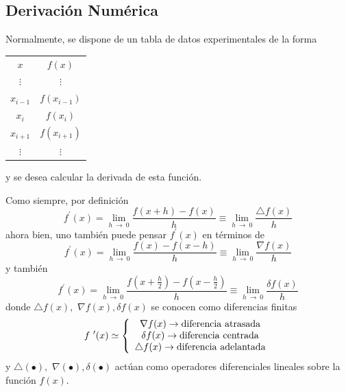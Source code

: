 \documentclass[spanish,titlepage,11pt]{article}
\begin{document}
\subsection{Derivaci\'{o}n Num\'{e}rica}

Normalmente, se dispone de un tabla de datos experimentales de la forma

\begin{center}%
\begin{tabular}
[c]{cc}%
$x$ & $f(x)$\\
$\vdots$ & $\vdots$\\
$x_{i-1}$ & $f(x_{i-1})$\\
$x_{i}$ & $f(x_{i})$\\
$x_{i+1}$ & $f(x_{i+1})$\\
$\vdots$ & $\vdots$%
\end{tabular}
\end{center}

y se desea calcular la derivada de esta funci\'{o}n.

Como siempre, por definici\'{o}n
\[
f^{\prime}(x)=\lim_{h\ \rightarrow\ 0}\frac{f(x+h)-f(x)}{h}\equiv
\lim_{h\ \rightarrow\ 0}\frac{\triangle f(x)}{h}%
\]
ahora bien, uno tambi\'{e}n puede pensar $f^{\prime}(x)$ en t\'{e}rminos de
\[
f^{\prime}(x)=\lim_{h\ \rightarrow\ 0}\frac{f(x)-f(x-h)}{h}\equiv
\lim_{h\ \rightarrow\ 0}\frac{\nabla f(x)}{h}%
\]
y tambi\'{e}n
\[
f^{\prime}(x)=\lim_{h\ \rightarrow\ 0}\frac{f\left(  x+\frac{h}{2}\right)
-f\left(  x-\frac{h}{2}\right)  }{h}\equiv\lim_{h\ \rightarrow\ 0}\frac{\delta
f(x)}{h}%
\]
donde $\triangle f(x),$ $\nabla f(x),\delta f(x)$ se conocen como diferencias
finitas
\[
f\ ^{\prime}(x)\simeq\left\{
\begin{array}
[c]{c}%
\nabla f(x)\rightarrow\mathrm{diferencia\ atrasada}\\
\delta f(x)\rightarrow\mathrm{diferencia\ centrada}\\
\triangle f(x)\rightarrow\mathrm{diferencia\ adelantada}%
\end{array}
\right.
\]
y $\triangle\left(  \bullet\right)  ,$ $\nabla\left(  \bullet\right)
,\delta\left(  \bullet\right)  $ act\'{u}an como operadores diferenciales
lineales sobre la funci\'{o}n $f(x).$
\end{document}
